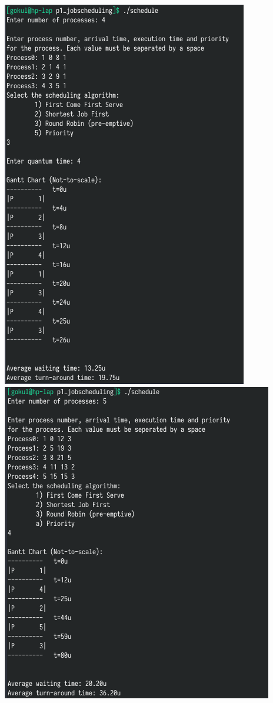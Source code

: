 \documentclass[13pt,oneside]{book}
\begin{document}
\includegraphics[]{img/p1/ss3.png} \\
\includegraphics[]{img/p1/ss4.png}
\end{document}
